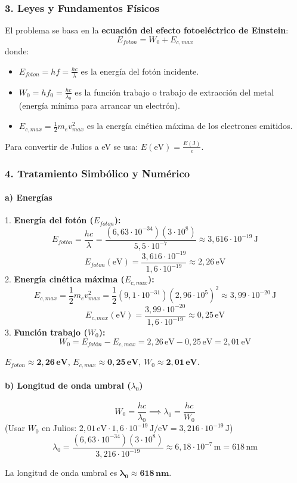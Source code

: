 \subsubsection*{3. Leyes y Fundamentos Físicos}
El problema se basa en la \textbf{ecuación del efecto fotoeléctrico de Einstein}:
$$ E_{foton} = W_0 + E_{c,max} $$
donde:
\begin{itemize}
    \item $E_{foton} = hf = \frac{hc}{\lambda}$ es la energía del fotón incidente.
    \item $W_0 = hf_0 = \frac{hc}{\lambda_0}$ es la función trabajo o trabajo de extracción del metal (energía mínima para arrancar un electrón).
    \item $E_{c,max} = \frac{1}{2}m_e v_{max}^2$ es la energía cinética máxima de los electrones emitidos.
\end{itemize}
Para convertir de Julios a eV se usa: $E (\text{eV}) = \frac{E (\text{J})}{e}$.

\subsubsection*{4. Tratamiento Simbólico y Numérico}
\paragraph{a) Energías}
1. \textbf{Energía del fotón ($E_{foton}$):}
$$ E_{fotón} = \frac{hc}{\lambda} = \frac{(6,63\cdot10^{-34})(3\cdot10^8)}{5,5\cdot10^{-7}} \approx 3,616 \cdot 10^{-19}\,\text{J} $$
$$ E_{foton} (\text{eV}) = \frac{3,616\cdot10^{-19}}{1,6\cdot10^{-19}} \approx 2,26\,\text{eV} $$
2. \textbf{Energía cinética máxima ($E_{c,max}$):}
$$ E_{c,max} = \frac{1}{2}m_e v_{max}^2 = \frac{1}{2}(9,1\cdot10^{-31})(2,96\cdot10^5)^2 \approx 3,99 \cdot 10^{-20}\,\text{J} $$
$$ E_{c,max} (\text{eV}) = \frac{3,99\cdot10^{-20}}{1,6\cdot10^{-19}} \approx 0,25\,\text{eV} $$
3. \textbf{Función trabajo ($W_0$):}
$$ W_0 = E_{fotón} - E_{c,max} = 2,26\,\text{eV} - 0,25\,\text{eV} = 2,01\,\text{eV} $$
\begin{cajaresultado}
$E_{foton} \approx \boldsymbol{2,26\,\textbf{eV}}$, $E_{c,max} \approx \boldsymbol{0,25\,\textbf{eV}}$, $W_0 \approx \boldsymbol{2,01\,\textbf{eV}}$.
\end{cajaresultado}

\paragraph{b) Longitud de onda umbral ($\lambda_0$)}
$$ W_0 = \frac{hc}{\lambda_0} \implies \lambda_0 = \frac{hc}{W_0} $$
(Usar $W_0$ en Julios: $2,01\,\text{eV} \cdot 1,6\cdot10^{-19}\,\text{J/eV} = 3,216 \cdot 10^{-19}\,\text{J}$)
$$ \lambda_0 = \frac{(6,63\cdot10^{-34})(3\cdot10^8)}{3,216\cdot10^{-19}} \approx 6,18 \cdot 10^{-7}\,\text{m} = 618\,\text{nm} $$
\begin{cajaresultado}
La longitud de onda umbral es $\boldsymbol{\lambda_0 \approx 618\,\textbf{nm}}$.
\end{cajaresultado}

